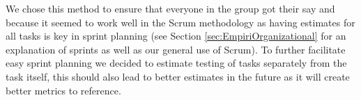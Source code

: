 We chose this method to ensure that everyone in the group got their say and because it seemed to work well in
the Scrum methodology as having estimates for all tasks is key in sprint planning (see Section
\ref{sec:EmpiriOrganizational} for an explanation of sprints as well as our general use of Scrum). To further
facilitate easy sprint planning we decided to estimate testing of tasks separately from the task itself, this
should also lead to better estimates in the future as it will create better metrics to reference.